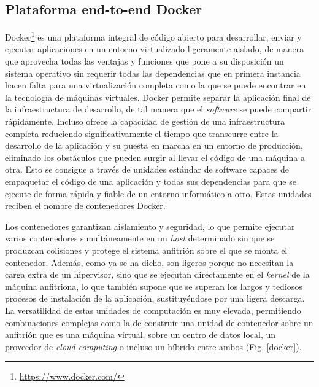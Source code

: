 \subsection{Plataforma end-to-end Docker}

Docker\footnote{\url{https://www.docker.com/}} es una plataforma integral de código abierto para desarrollar, enviar y ejecutar aplicaciones en un entorno virtualizado ligeramente aislado, de manera que aprovecha todas las ventajas y funciones que pone a su disposición un sistema operativo sin requerir todas las dependencias que en primera instancia hacen falta para una virtualización completa como la que se puede encontrar en la tecnología de máquinas virtuales. Docker permite separar la aplicación final de la infraestructura de desarrollo, de tal manera que el \textit{software} se puede compartir rápidamente. Incluso ofrece la capacidad de gestión de una infraestructura completa reduciendo significativamente el tiempo que transcurre entre la desarrollo de la aplicación y su puesta en marcha en un entorno de producción, eliminado los obstáculos que pueden surgir al llevar el código de una máquina a otra. Esto se consigue a través de unidades estándar de software capaces de empaquetar el código de una aplicación y todas sus dependencias para que se ejecute de forma rápida y fiable de un entorno informático a otro. Estas unidades reciben el nombre de contenedores Docker.

Los contenedores garantizan aislamiento y seguridad, lo que permite ejecutar varios contenedores simultáneamente en un \textit{host} determinado sin que se produzcan colisiones y protege el sistema anfitrión sobre el que se monta el contenedor. Además, como ya se ha dicho, son ligeros porque no necesitan la carga extra de un hipervisor, sino que se ejecutan directamente en el \textit{kernel} de la máquina anfitriona, lo que también supone que se superan los largos y tediosos procesos de instalación de la aplicación, sustituyéndose por una ligera descarga. La versatilidad de estas unidades de computación es muy elevada, permitiendo combinaciones complejas como la de construir una unidad de contenedor sobre un anfitrión que es una máquina virtual, sobre un centro de datos local, un proveedor de \textit{cloud computing} o incluso un híbrido entre ambos (Fig. \ref{docker}).


